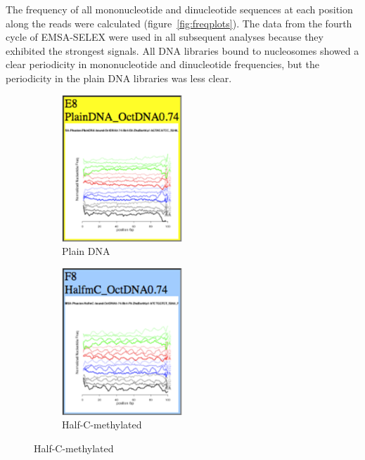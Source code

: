 \documentclass[parskip=full, numbers=noenddot]{scrreprt}
\begin{document}
The frequency of all mononucleotide and dinucleotide sequences at each position along the reads were calculated (figure~\ref{fig:freqplots}).  The data from the fourth cycle of EMSA-SELEX were used in all subsequent analyses because they exhibited the strongest signals.  All DNA libraries bound to nucleosomes showed a clear periodicity in mononucleotide and dinucleotide frequencies, but the periodicity in the plain DNA libraries was less clear.

\begin{figure}[htpb]
  \centering
  \begin{subfigure}[htpb]{0.5\textwidth}
    \centering
    \includegraphics[width=0.5\textwidth]{emsa_e8_counts}
    \caption{Plain DNA}
    \label{fig:freqplots_e8}
  \end{subfigure}
  \begin{subfigure}[htpb]{0.5\textwidth}
    \centering
    \includegraphics[width=0.5\textwidth]{emsa_f8_counts}
    \caption{Half-C-methylated}
    \label{fig:freqplots_f8}
  \end{subfigure}

\end{figure}
\end{document}
